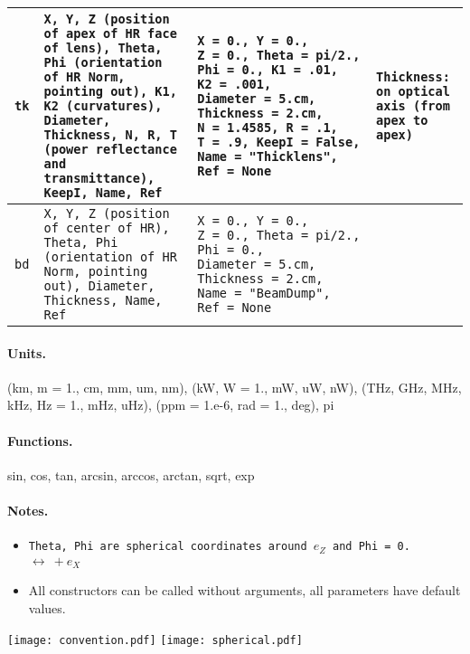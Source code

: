 \documentclass[a4paper, landscape]{article}
\begin{document}
\begin{tabular}{| p{.6cm} | p{7cm}| p{6cm} | p{5cm} |}
\tt{tk} & \tt{X}, \tt{Y}, \tt{Z} (position of apex of HR face of lens), \tt{Theta}, \tt{Phi} (orientation of HR Norm, pointing out), \tt{K1}, \tt{K2} (curvatures), \tt{Diameter},  \tt{Thickness}, \tt{N}, \tt{R}, \tt{T} (power reflectance and transmittance), \tt{KeepI}, \tt{Name}, \tt{Ref} & \tt{X}~=~0., \tt{Y}~=~0., \tt{Z}~=~0., \tt{Theta}~=~pi/2., \tt{Phi}~=~0., \tt{K1}~=~.01, \tt{K2}~=~.001, \tt{Diameter}~=~5.cm,  \tt{Thickness}~=~2.cm, \tt{N}~=~1.4585, \tt{R}~=~.1, \tt{T}~=~.9, \tt{KeepI}~=~False, \tt{Name}~=~"Thicklens", \tt{Ref}~=~None & \tt{Thickness}: on optical axis (from apex to apex) \\ \hline

\tt{bd} & \tt{X}, \tt{Y}, \tt{Z} (position of center of HR), \tt{Theta}, \tt{Phi} (orientation of HR Norm, pointing out), \tt{Diameter},  \tt{Thickness}, \tt{Name}, \tt{Ref} & \tt{X}~=~0., \tt{Y}~=~0., \tt{Z}~=~0., \tt{Theta}~=~pi/2., \tt{Phi}~=~0., \tt{Diameter}~=~5.cm,  \tt{Thickness}~=~2.cm, \tt{Name}~=~"BeamDump", \tt{Ref}~=~None & \\ \hline

\end{tabular}

\begin{multicols}{2}

\paragraph{Units.}(km, m = 1., cm, mm, um, nm), (kW, W = 1., mW, uW, nW), (THz, GHz, MHz, kHz, Hz = 1., mHz, uHz), (ppm = 1.e-6, rad = 1., deg), pi
\paragraph{Functions.} sin, cos, tan, arcsin, arccos, arctan, sqrt, exp

\paragraph{Notes.}\begin{itemize}
\item \tt{Theta}, \tt{Phi} are spherical coordinates around $e_Z$ and \tt{Phi = 0.} $\leftrightarrow~ + e_X$ 
\item All constructors can be called without arguments, all parameters have default values.
\end{itemize}

\texttt{[image: convention.pdf]}
\texttt{[image: spherical.pdf]}



\end{multicols}
\end{document}
